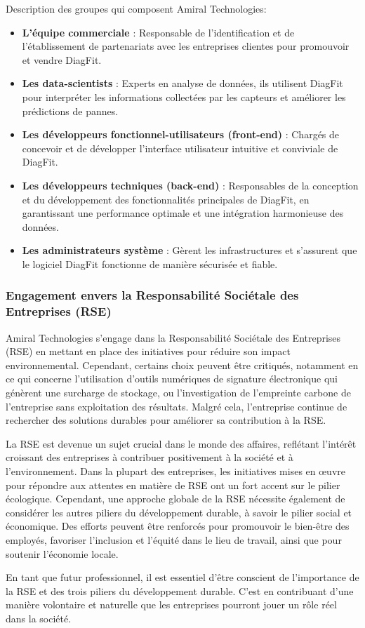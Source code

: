 Description des groupes qui composent Amiral Technologies:
\begin{itemize}
    \item \textbf{L'équipe commerciale} : Responsable de l'identification et de l'établissement de partenariats avec les entreprises clientes pour promouvoir et vendre DiagFit.
    \item \textbf{Les data-scientists} : Experts en analyse de données, ils utilisent DiagFit pour interpréter les informations collectées par les capteurs et améliorer les prédictions de pannes.
    \item \textbf{Les développeurs fonctionnel-utilisateurs (front-end)} : Chargés de concevoir et de développer l'interface utilisateur intuitive et conviviale de DiagFit.
    \item \textbf{Les développeurs techniques (back-end)} : Responsables de la conception et du développement des fonctionnalités principales de DiagFit, en garantissant une performance optimale et une intégration harmonieuse des données.
    \item \textbf{Les administrateurs système} : Gèrent les infrastructures et s'assurent que le logiciel DiagFit fonctionne de manière sécurisée et fiable.
\end{itemize}


\subsubsection{Engagement envers la Responsabilité Sociétale des Entreprises (RSE)}
Amiral Technologies s'engage dans la Responsabilité Sociétale des Entreprises (RSE) en mettant en place des initiatives pour réduire son impact environnemental.
Cependant, certains choix peuvent être critiqués, notamment en ce qui concerne l'utilisation d'outils numériques de signature électronique qui génèrent une surcharge de stockage, ou l'investigation de l'empreinte carbone de l'entreprise sans exploitation des résultats.
Malgré cela, l'entreprise continue de rechercher des solutions durables pour améliorer sa contribution à la RSE.

La RSE est devenue un sujet crucial dans le monde des affaires, reflétant l'intérêt croissant des entreprises à contribuer positivement à la société et à l'environnement.
Dans la plupart des entreprises, les initiatives mises en œuvre pour répondre aux attentes en matière de RSE ont un fort accent sur le pilier écologique.
Cependant, une approche globale de la RSE nécessite également de considérer les autres piliers du développement durable, à savoir le pilier social et économique.
Des efforts peuvent être renforcés pour promouvoir le bien-être des employés, favoriser l'inclusion et l'équité dans le lieu de travail, ainsi que pour soutenir l'économie locale.

En tant que futur professionnel, il est essentiel d'être conscient de l'importance de la RSE et des trois piliers du développement durable.
C'est en contribuant d'une manière volontaire et naturelle que les entreprises pourront jouer un rôle réel dans la société.